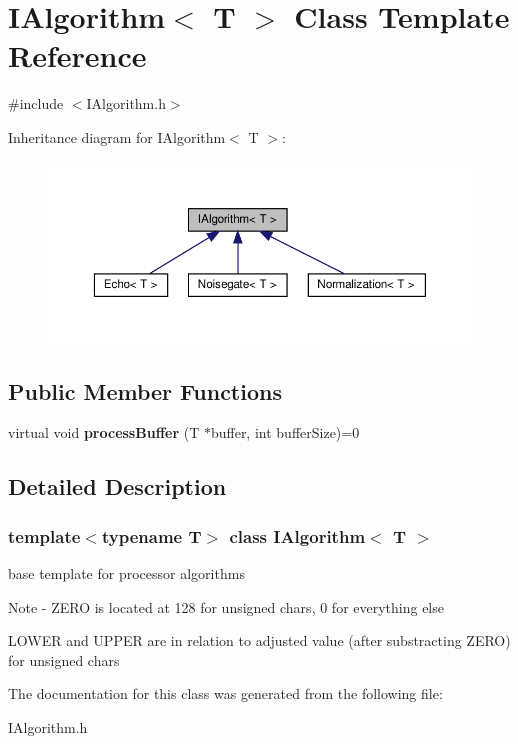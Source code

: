 \hypertarget{classIAlgorithm}{}\section{I\+Algorithm$<$ T $>$ Class Template Reference}
\label{classIAlgorithm}


{\ttfamily \#include $<$I\+Algorithm.\+h$>$}



Inheritance diagram for I\+Algorithm$<$ T $>$\+:
\nopagebreak
\begin{figure}[H]
\begin{center}
\leavevmode
\includegraphics[width=350pt]{d2/df4/classIAlgorithm__inherit__graph}
\end{center}
\end{figure}
\subsection*{Public Member Functions}
\begin{DoxyCompactItemize}
\item 
\mbox{\label{classIAlgorithm_af5d33413d39ce61d543a73f951a4a4eb}} 
virtual void {\bfseries process\+Buffer} (T $\ast$buffer, int buffer\+Size)=0
\end{DoxyCompactItemize}


\subsection{Detailed Description}
\subsubsection*{template$<$typename T$>$\newline
class I\+Algorithm$<$ T $>$}


\begin{DoxyItemize}
\item base template for processor algorithms \begin{DoxyNote}{Note}
-\/ Z\+E\+RO is located at 128 for unsigned chars, 0 for everything else 

L\+O\+W\+ER and U\+P\+P\+ER are in relation to adjusted value (after substracting Z\+E\+RO) for unsigned chars 
\end{DoxyNote}

\end{DoxyItemize}

The documentation for this class was generated from the following file\+:\begin{DoxyCompactItemize}
\item 
I\+Algorithm.\+h\end{DoxyCompactItemize}
